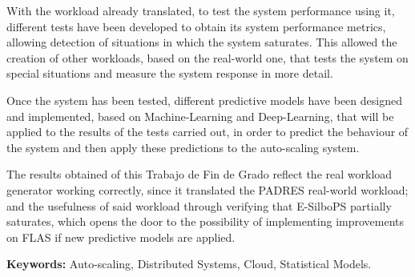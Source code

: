 With the workload already translated, to test the system performance using it, 
different tests have been developed to obtain its system performance metrics, allowing
detection of situations in which the system saturates. This allowed the creation of
other workloads, based on the real-world one, that tests the system on special
situations and measure the system response in more detail.


Once the system has been tested, different predictive models have been designed and
implemented, based on Machine-Learning and Deep-Learning, that will be applied to the 
results of the tests carried out, in order to predict the behaviour of the system and 
then apply these predictions to the auto-scaling system.

The results obtained of this Trabajo de Fin de Grado reflect the real workload generator 
working correctly, since it translated the PADRES real-world workload; and the usefulness of said
workload through verifying that E-SilboPS partially saturates, which opens the door
to the possibility of implementing improvements on FLAS if new predictive models are applied.

\textbf{Keywords:} Auto-scaling, Distributed Systems, Cloud, Statistical Models.


